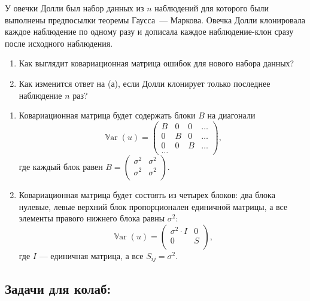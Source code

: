 \documentclass[12pt]{article}
\DeclareMathOperator{\Var}{\mathbb{V}ar}
\newenvironment{sol}{}{}
\begin{document}
\begin{problem}
У овечки Долли был набор данных из $n$ наблюдений для которого были выполнены предпосылки теоремы Гаусса~— Маркова. 
Овечка Долли клонировала каждое наблюдение по одному разу и дописала каждое наблюдение-клон сразу после исходного наблюдения. 

\begin{enumerate}
  \item Как выглядит ковариационная матрица ошибок для нового набора данных?
  \item Как изменится ответ на (а), если Долли клонирует только последнее наблюдение $n$ раз?
\end{enumerate}
\begin{sol}
    \begin{enumerate}
        \item Ковариационная матрица будет содержать блоки $B$ на диагонали
\[
\Var(u) = \begin{pmatrix}
            B & 0 & 0 & \dots \\
            0 & B & 0 & \dots \\
            0 & 0 & B & \dots \\
            \dots
        \end{pmatrix},
\]
где каждый блок равен $B = \begin{pmatrix}
    \sigma^2 & \sigma^2 \\
    \sigma^2 & \sigma^2 \\    
\end{pmatrix}$.
        \item Ковариационная матрица будет состоять из четырех блоков: два блока нулевые, левые верхний блок пропорционален единичной матрицы, 
        а все элементы правого нижнего блока равны $\sigma^2$:
\[
\Var(u) = \begin{pmatrix}
            \sigma^2 \cdot I & 0 \\
            0 & S \\
        \end{pmatrix},
\]
где $I$ — единичная матрица, а все $S_{ij} = \sigma^2$.
    \end{enumerate}
\end{sol}
\end{problem}



\subsection{Задачи для колаб:}
\end{document}
